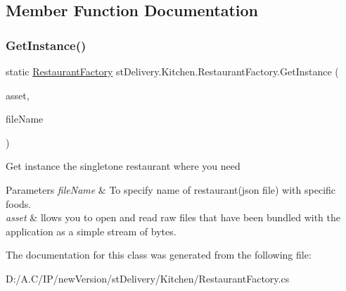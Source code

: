 \subsection{Member Function Documentation}
\mbox{\label{classst_delivery_1_1_kitchen_1_1_restaurant_factory_a82b1cb3a0a73dfb4b648fabadfd12028}} 
\subsubsection{\texorpdfstring{Get\+Instance()}{GetInstance()}}
{\footnotesize\ttfamily static \hyperlink{classst_delivery_1_1_kitchen_1_1_restaurant_factory}{Restaurant\+Factory} st\+Delivery.\+Kitchen.\+Restaurant\+Factory.\+Get\+Instance (\begin{DoxyParamCaption}\item[{Asset\+Manager}]{asset,  }\item[{string}]{file\+Name }\end{DoxyParamCaption})\hspace{0.3cm}{\ttfamily [static]}}



Get instance the singletone restaurant where you need 


\begin{DoxyParams}{Parameters}
{\em file\+Name} & To specify name of restaurant(json file) with specific foods.\\
\hline
{\em asset} & llows you to open and read raw files that have been bundled with the application as a simple stream of bytes.\\
\hline
\end{DoxyParams}


The documentation for this class was generated from the following file\+:\begin{DoxyCompactItemize}
\item 
D\+:/\+A.\+C/\+I\+P/new\+Version/st\+Delivery/\+Kitchen/Restaurant\+Factory.\+cs\end{DoxyCompactItemize}
